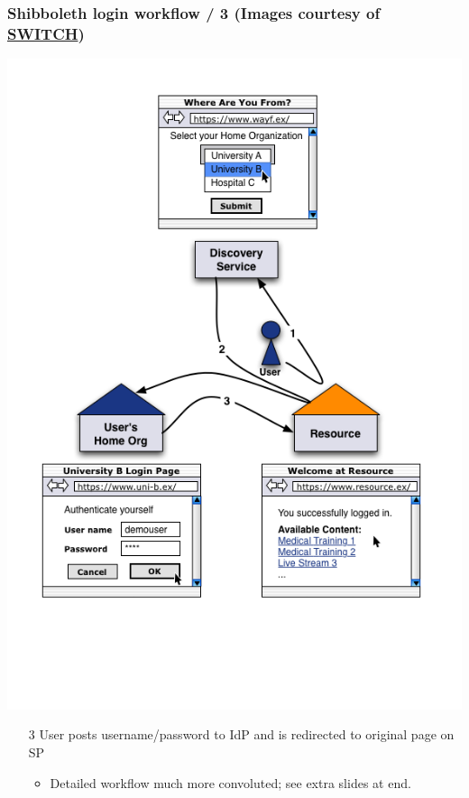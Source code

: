 \documentclass{beamer}
\newcommand{\+}{\vspace{1em}}
\begin{document}
\begin{frame}
  \frametitle{Shibboleth login workflow / 3
    \hfill%
    {\tiny (Images courtesy of 
      \href{http://www.switch.ch/aai/demo/2/medium.html}{SWITCH})}
  }
  \begin{center}
    \includegraphics[height=0.66\textheight]{simple_complete}
  \end{center}
  \begin{enumerate}
  \item[3] User posts username/password to IdP and is redirected to
    original page on SP
    \begin{itemize}
    \item Detailed workflow much more convoluted; see extra slides at end.
    \end{itemize}
  \end{enumerate}

  \+
  \hyperlink{shib}{}
\end{frame}
\end{document}
